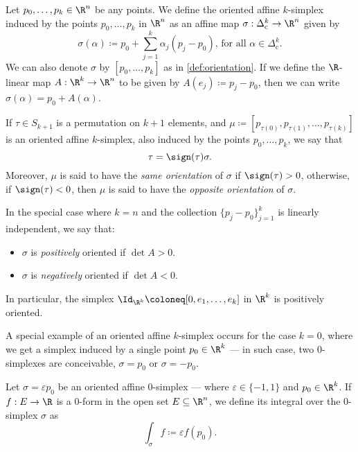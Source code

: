\begin{definition}
\label{def:oriented-affine-k-simplex}
Let \(p_0, \dots, p_k \in \R^n\) be any points. We define the oriented affine
\(k\)-simplex induced by the points \(p_0, \dots, p_k\) in \(\R^n\) as an affine
map \(\sigma: \Delta_{\text{c}}^k \to \R^n\) given by
\[
  \sigma(\alpha) \coloneq p_0 + \sum_{j=1}^k \alpha_j (p_j - p_0)
  \text{, for all } \alpha \in \Delta_{\text{c}}^k.
\]
We can also denote \(\sigma\) by \([p_0, \dots, p_k]\) as in
\cref{def:orientation}. If we define the \(\R\)-linear map \(A: \R^k \to \R^n\)
to be given by \(A(e_j) \coloneq p_j - p_0\), then we can write \(\sigma(\alpha)
= p_0 + A(\alpha)\).

If \(\tau \in S_{k+1}\) is a permutation on \(k+1\) elements, and \(\mu \coloneq
[p_{\tau(0)}, p_{\tau(1)}, \dots, p_{\tau(k)}]\) is an oriented affine
\(k\)-simplex, also induced by the points \(p_0, \dots, p_k\), we say that
\[
  \tau = \sign(\tau) \sigma.
\]
Moreover, \(\mu\) is said to have the \emph{same orientation} of \(\sigma\) if
\(\sign(\tau) > 0\), otherwise, if \(\sign(\tau) < 0\), then \(\mu\) is said to
have the \emph{opposite orientation} of \(\sigma\).

In the special case where \(k = n\) and the collection \(\{p_{j} -
p_0\}_{j=1}^k\) is linearly independent, we say that:
\begin{itemize}\setlength\itemsep{0em}
\item \(\sigma\) is \emph{positively} oriented if \(\det A > 0\).
\item \(\sigma\) is \emph{negatively} oriented if \(\det A < 0\).
\end{itemize}
In particular, the simplex \(\Id_{\R^k} \coloneq [0, e_1, \dots, e_k]\) in
\(\R^k\) is positively oriented.
\end{definition}

\begin{example}
\label{exp:oriented-0-simplex}
A special example of an oriented affine \(k\)-simplex occurs for the case \(k =
0\), where we get a simplex induced by a single point \(p_0 \in \R^k\) --- in
such case, two \(0\)-simplexes are conceivable, \(\sigma = p_0\) or \(\sigma =
-p_0\).
\end{example}

\begin{definition}
\label{def:oriented-0-simplex-integral-0-form}
Let \(\sigma = \varepsilon p_0\) be an oriented affine \(0\)-simplex --- where
\(\varepsilon \in \{-1, 1\}\) and \(p_0 \in \R^k\). If \(f: E \to \R\) is a
\(0\)-form in the open set \(E \subseteq \R^n\), we define its integral over the
\(0\)-simplex \(\sigma\) as
\[
  \int_{\sigma} f \coloneq \varepsilon f(p_0).
\]
\end{definition}

